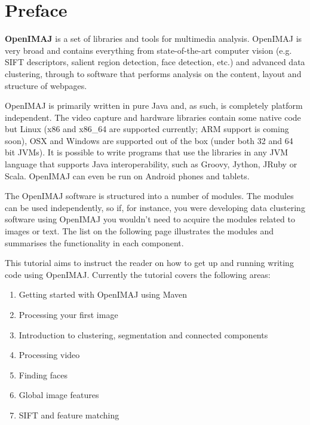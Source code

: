 \chapter*{Preface}\normalsize
{}
\pagestyle{plain}

\textbf{OpenIMAJ} is a set of libraries and tools for multimedia analysis. 
OpenIMAJ is very broad and contains everything from state-of-the-art computer 
vision (e.g. SIFT descriptors, salient region detection, face detection, etc.) 
and advanced data clustering, through to software that performs analysis on the 
content, layout and structure of webpages.

OpenIMAJ is primarily written in pure Java and, as such, is completely platform 
independent. The video capture and hardware libraries contain some native code 
but Linux (x86 and x86\_64 are supported currently; ARM support is coming soon), 
OSX and Windows are supported out of the box (under both 32 and 64 bit JVMs). 
It is possible to write programs that use the libraries in any JVM language 
that supports Java interoperability, such as Groovy, Jython, JRuby or 
Scala. OpenIMAJ can even be run on Android phones and tablets.

The OpenIMAJ software is structured into a number of modules. The modules 
can be used independently, so if, for instance, you were developing data 
clustering software using OpenIMAJ you wouldn't need to acquire the modules related 
to images or text. The list on the following page illustrates the modules 
and summarises the functionality in each component.

This tutorial aims to instruct the reader on how to get up and running
writing code using OpenIMAJ. Currently the tutorial covers the following areas:
\begin{enumerate}
	\item Getting started with OpenIMAJ using Maven
	\item Processing your first image
	\item Introduction to clustering, segmentation and connected components
	\item Processing video
	\item Finding faces
	\item Global image features
	\item SIFT and feature matching
\end{enumerate}

